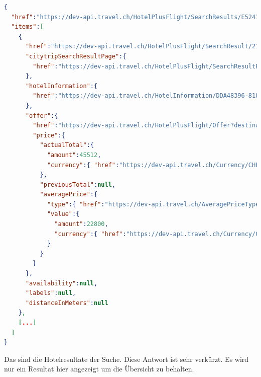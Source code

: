 \begin{lstlisting}[language=json,firstnumber=1]
{
  "href":"https://dev-api.travel.ch/HotelPlusFlight/SearchResults/E5241069-1272-4DD0-946E-46DD2E9D55E6",
  "items":[
    {
      "href":"https://dev-api.travel.ch/HotelPlusFlight/SearchResult/21ca65ff-976a-4a3e-bc92-b17608db3b25?pageId=58B8D81D-12B5-4EEE-9CE9-902CCDF01791",
      "citytripSearchResultPage":{
        "href":"https://dev-api.travel.ch/HotelPlusFlight/SearchResultPage/19E2B6BB-1F06-4396-B86E-169EDB368B0E?paging.offset=0&paging.size=12&sortMethod.type=https%3A%2F%2Fdev-api.travel.ch%2FSortType%2FPrice[...]"
      },
      "hotelInformation":{
        "href":"https://dev-api.travel.ch/HotelInformation/DDA48396-8105-433D-B75B-668F96EC89D8"
      },
      "offer":{
        "href":"https://dev-api.travel.ch/HotelPlusFlight/Offer?destination=https%3A%2F%2Fdev-api.travel.ch%2FDestination%2FH_63CA0931EAD8A33EF988144360A8056C&offerHotelInformation=https%3A%2F%2Fdev-api.travel.ch%2FHotelInformation%2FDDA48396-8105-433D-B75B-668F96EC89D8[...]",
        "price":{
          "actualTotal":{
            "amount":45512,
            "currency":{ "href":"https://dev-api.travel.ch/Currency/CHF" }
          },
          "previousTotal":null,
          "averagePrice":{
            "type":{ "href":"https://dev-api.travel.ch/AveragePriceType/PerPerson" },
            "value":{
              "amount":22800,
              "currency":{ "href":"https://dev-api.travel.ch/Currency/CHF" }
            }
          }
        }
      },
      "availability":null,
      "labels":null,
      "distanceInMeters":null
    },
    [...]
  ]
}
\end{lstlisting}
Das sind die Hotelresultate der Suche. Diese Antwort ist sehr verkürzt. Es wird nur ein Resultat hier angezeigt um die Übersicht zu behalten.



